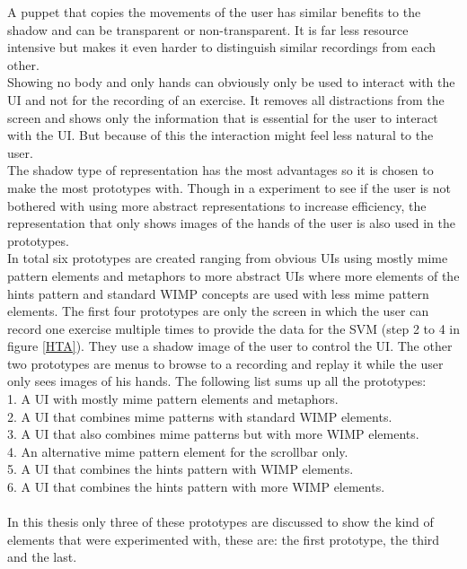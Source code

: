 A puppet that copies the movements of the user has similar benefits to the shadow and can be transparent or non-transparent. It is far less resource intensive but makes it even harder to distinguish similar recordings from each other.\\
 
Showing no body and only hands can obviously only be used to interact with the UI and not for the recording of an exercise. It removes all distractions from the screen and shows only the information that is essential for the user to interact with the UI. But because of this the interaction might feel less natural to the user.\\
 
The shadow type of representation has the most advantages so it is chosen to make the most prototypes with. Though in a experiment to see if the user is not bothered with using more abstract representations to increase efficiency, the representation that only shows images of the hands of the user is also used in the prototypes.\\
 
In total six prototypes are created ranging from obvious UIs using mostly mime pattern elements and metaphors to more abstract UIs where more elements of the hints pattern and standard WIMP concepts are used with less mime pattern elements. The first four prototypes are only the screen in which the user can record one exercise multiple times to provide the data for the SVM (step 2 to 4 in figure \ref{HTA}). They use a shadow image of the user to control the UI. The other two prototypes are menus to browse to a recording and replay it while the user only sees images of his hands. The following list sums up all the prototypes: \\

1. A UI with mostly mime pattern elements and metaphors. \\
2. A UI that combines mime patterns with standard WIMP elements. \\
3. A UI that also combines mime patterns but with more WIMP elements. \\
4. An alternative mime pattern element for the scrollbar only. \\
5. A UI that combines the hints pattern with WIMP elements. \\
6. A UI that combines the hints pattern with more WIMP elements.\\ \\

In this thesis only three of these prototypes are discussed to show the kind of elements that were experimented with, these are: the first prototype, the third and the last.\\

